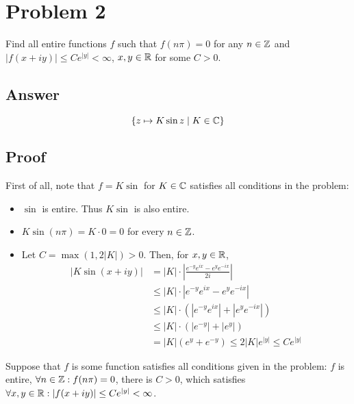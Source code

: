\section*{Problem 2}

Find all entire functions \(f\) such that
\(f (n\pi) = 0\) for any \(n \in \mathbb{Z}\)
and \(\left|f(x+iy)\right| \le Ce^{\left|y\right|} < \infty\),
\(x, y \in \mathbb{R}\) for some \(C > 0\).

\subsection*{Answer}

\[\{z \mapsto K \sin z \mid K \in \mathbb{C}\}\]

\subsection*{Proof}

First of all, note that \(f = K\sin\) for \(K \in \mathbb{C}\) satisfies all conditions in the problem:
\begin{itemize}
\item \(\sin\) is entire. Thus \(K \sin\) is also entire.
\item \(K\sin(n\pi) = K \cdot 0 = 0\) for every \(n \in \mathbb{Z}\).
\item Let \(C = \max(1, 2 |K|) > 0\). Then, for \(x, y \in \mathbb{R}\),
  \begin{align*}
    |K \sin (x + iy)|
    &= |K| \cdot \left| \frac{e^{-y} e^{ix} - e^{y} e^{-ix}}{2i} \right|
    \\&\le |K| \cdot \left| e^{-y} e^{ix} - e^{y} e^{-ix} \right|
    \\&\le |K| \cdot (\left| e^{-y} e^{ix} \right| + \left| e^{y} e^{-ix} \right|)
    \\&\le |K| \cdot (\left| e^{-y} \right| + \left| e^{y} \right|)
    \\&= |K| (e^y + e^{-y})
    \le 2 |K| e^{|y|} \le C e^{|y|}
  \end{align*}
\end{itemize}

Suppose that \(f\) is some function satisfies all conditions given in the problem: 
\(f\) is entire, \(\forall n \in \mathbb{Z}: f(n\pi) = 0\), there is \(C > 0\), which satisfies \(\forall x, y \in \mathbb{R}: |f(x + iy)| \le Ce^{|y|} < \infty\).

